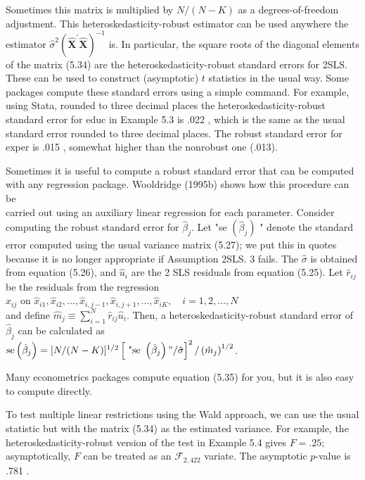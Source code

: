 \documentclass[10pt]{article}
\begin{document}
Sometimes this matrix is multiplied by $N /(N-K)$ as a degrees-of-freedom adjustment. This heteroskedasticity-robust estimator can be used anywhere the estimator $\hat{\sigma}^{2}\left(\hat{\mathbf{X}}^{\prime} \hat{\mathbf{X}}\right)^{-1}$ is. In particular, the square roots of the diagonal elements of the matrix (5.34) are the heteroskedasticity-robust standard errors for 2SLS. These can be used to construct (asymptotic) $t$ statistics in the usual way. Some packages compute these standard errors using a simple command. For example, using Stata, rounded to three decimal places the heteroskedasticity-robust standard error for educ in Example 5.3 is .022 , which is the same as the usual standard error rounded to three decimal places. The robust standard error for exper is .015 , somewhat higher than the nonrobust one (.013).

Sometimes it is useful to compute a robust standard error that can be computed with any regression package. Wooldridge (1995b) shows how this procedure can be\\
carried out using an auxiliary linear regression for each parameter. Consider computing the robust standard error for $\hat{\beta}_{j}$. Let "se $\left(\hat{\beta}_{j}\right)$ " denote the standard error computed using the usual variance matrix (5.27); we put this in quotes because it is no longer appropriate if Assumption 2SLS. 3 fails. The $\hat{\sigma}$ is obtained from equation (5.26), and $\hat{u}_{i}$ are the 2 SLS residuals from equation (5.25). Let $\hat{r}_{i j}$ be the residuals from the regression\\
$\hat{x}_{i j}$ on $\hat{x}_{i 1}, \hat{x}_{i 2}, \ldots, \hat{x}_{i, j-1}, \hat{x}_{i, j+1}, \ldots, \hat{x}_{i K}, \quad i=1,2, \ldots, N$\\
and define $\hat{m}_{j} \equiv \sum_{i=1}^{N} \hat{r}_{i j} \hat{u}_{i}$. Then, a heteroskedasticity-robust standard error of $\hat{\beta}_{j}$ can be calculated as\\
$\operatorname{se}\left(\hat{\beta}_{j}\right)=[N /(N-K)]^{1 / 2}\left[\text { "se }\left(\hat{\beta}_{j}\right) " / \hat{\sigma}\right]^{2} /\left(\hat{m}_{j}\right)^{1 / 2}$.

Many econometrics packages compute equation (5.35) for you, but it is also easy to compute directly.

To test multiple linear restrictions using the Wald approach, we can use the usual statistic but with the matrix (5.34) as the estimated variance. For example, the heteroskedasticity-robust version of the test in Example 5.4 gives $F=.25$; asymptotically, $F$ can be treated as an $\mathscr{F}_{2,422}$ variate. The asymptotic $p$-value is .781 .
\end{document}
